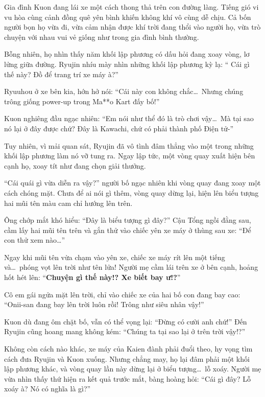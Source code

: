 \documentclass[../main.tex]{subfiles}
\begin{document}
Gia đình Kuon đang lái xe một cách thong thả trên con đường làng. Tiếng gió vi vu hòa cùng cảnh đồng quê yên bình khiến không khí vô cùng dễ chịu. Cả bốn người bọn họ vừa đi, vừa cảm nhận được khí trời đang thổi vào người họ, vừa trò chuyện với nhau vui vẻ giống như trong gia đình bình thường.

Bỗng nhiên, họ nhìn thấy năm khối lập phương có dấu hỏi đang xoay vòng, lơ lửng giữa đường. Ryujin nhíu mày nhìn những khối lập phương kỳ lạ: ``{\color{red} Cái gì thế này? Đồ để trang trí xe máy à?}''

Ryuuhou ở xe bên kia, hớn hở nói: ``{\color{red}Cái này con không chắc\dots\ Nhưng chúng trông giống power-up trong Ma**o Kart đấy bố!}''

Kuon nghiêng đầu ngạc nhiên: ``{\color{red}Em nói như thể đó là trò chơi vậy\dots\ Mà tại sao nó lại ở đây được chứ? Đây là Kawachi, chứ có phải thành phố Điện tử-}''

Tuy nhiên, vì mải quan sát, Ryujin đã vô tình đâm thẳng vào một trong những khối lập phương làm nó vỡ tung ra. Ngay lập tức, một vòng quay xuất hiện bên cạnh họ, xoay tít như đang chọn giải thưởng.

``{\color{red}Cái quái gì vừa diễn ra vậy?}'' người bố ngạc nhiên khi vòng quay đang xoay một cách chóng mặt. Chưa để ai nói gì thêm, vòng quay dừng lại, hiện lên biểu tượng hai mũi tên màu cam chỉ hướng lên trên.

Ông chớp mắt khó hiểu: ``{\color{red}Đây là biểu tượng gì đây?}'' Cậu Tổng ngồi đằng sau, cầm lấy hai mũi tên trên và gắn thử vào chiếc yên xe máy ở thùng sau xe: ``{\color{red}Để con thử xem nào\dots}''

Ngay khi mũi tên vừa chạm vào yên xe, chiếc xe máy rít lên một tiếng và\dots\ phóng vọt lên trời như tên lửa! Người mẹ cầm lái trên xe ở bên cạnh, hoảng hốt hét lên: ``{\color{red}\textbf{Chuyện gì thế này!? Xe biết bay ư!?}}''

Cô em gái ngửa mặt lên trời, chỉ vào chiếc xe của hai bố con đang bay cao: ``{\color{red}Onii-san đang bay lên trời luôn rồi! Trông như siêu nhân vậy!}''

Kuon dù đang ôm chặt bố, vẫn có thể vọng lại: ``{\color{red}Đừng có cười anh chứ!}'' Đến Ryujin cũng hoang mang không kém: ``{\color{red}Chúng ta tại sao lại ở trên trời vậy!?}''

Không còn cách nào khác, xe máy của Kaien đành phải đuổi theo, hy vọng tìm cách đưa Ryujin và Kuon xuống. Nhưng chẳng may, họ lại đâm phải một khối lập phương khác, và vòng quay lần này dừng lại ở biểu tượng\dots\ lỗ xoáy. Người mẹ vừa nhìn thấy thứ hiện ra kết quả trước mắt, bàng hoàng hỏi: ``{\color{red}Cái gì đây? Lỗ xoáy à? Nó có nghĩa là gì?}''
\end{document}
